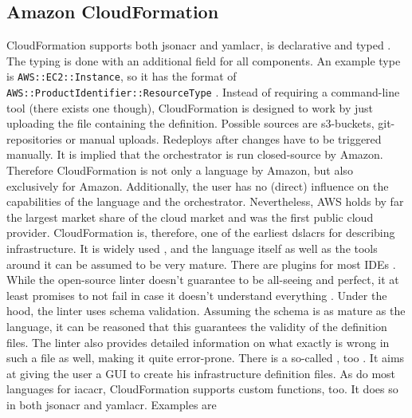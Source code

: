 \subsection{Amazon CloudFormation}
CloudFormation supports both \gls{jsonacr} and \gls{yamlacr}, is declarative and typed \cite{aws_cfn_concept}. The typing is done with an additional field  for all components. An example type is \texttt{AWS::EC2::Instance}, so it has the format of \texttt{AWS::ProductIdentifier::ResourceType} \cite{aws_cfn_concept}.
\newline
Instead of requiring a command-line tool (there exists one \cite{aws_cf_cli} though), CloudFormation is designed to work by just uploading the file containing the definition. Possible sources are s3-buckets, git-repositories or manual uploads. Redeploys after changes have to be triggered manually. It is implied that the orchestrator is run closed-source by Amazon. Therefore CloudFormation is not only a language by Amazon, but also exclusively for Amazon. Additionally, the user has no (direct) influence on the capabilities of the language and the orchestrator.
\newline
Nevertheless, AWS holds by far the largest market share of the cloud market \cite{statista_marketshare_cloud} and was the first public cloud provider. CloudFormation is, therefore, one of the earliest \gls{dslacr}s for describing infrastructure. It is widely used \cite{stackshare_aws_cloudformation}, and the language itself as well as the tools around it can be assumed to be very mature. There are plugins for most IDEs \cite{github_cfn_lint}. While the open-source linter doesn't guarantee to be all-seeing and perfect, it at least promises to not fail in case it doesn't understand everything \cite{github_cfn_lint}. Under the hood, the linter uses schema validation. Assuming the schema is as mature as the language, it can be reasoned that this guarantees the validity of the definition files. The linter also provides detailed information on what exactly is wrong in such a file as well, making it quite error-prone. There is a so-called , too \cite{aws_cloudformation_designer}. It aims at giving the user a GUI to create his infrastructure definition files.
\newline
As do most languages for \gls{iacacr}, CloudFormation supports custom functions, too. It does so in both \gls{jsonacr} and \gls{yamlacr}. Examples are
\newline %
